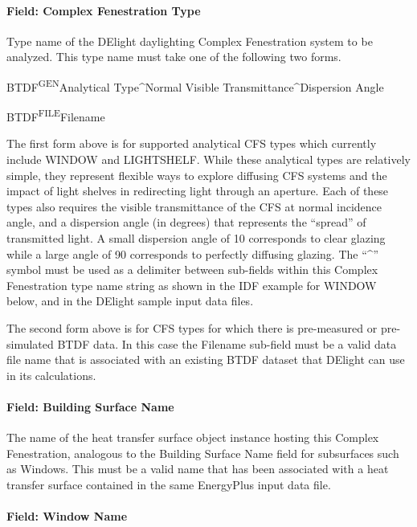\paragraph{Field: Complex Fenestration Type}\label{field-complex-fenestration-type}

Type name of the DElight daylighting Complex Fenestration system to be analyzed. This type name must take one of the following two forms.

BTDF\textsuperscript{GEN}Analytical Type\^{}Normal Visible Transmittance\^{}Dispersion Angle

BTDF\textsuperscript{FILE}Filename

The first form above is for supported analytical CFS types which currently include WINDOW and LIGHTSHELF. While these analytical types are relatively simple, they represent flexible ways to explore diffusing CFS systems and the impact of light shelves in redirecting light through an aperture. Each of these types also requires the visible transmittance of the CFS at normal incidence angle, and a dispersion angle (in degrees) that represents the ``spread'' of transmitted light. A small dispersion angle of 10 corresponds to clear glazing while a large angle of 90 corresponds to perfectly diffusing glazing. The ``\^{}'' symbol must be used as a delimiter between sub-fields within this Complex Fenestration type name string as shown in the IDF example for WINDOW below, and in the DElight sample input data files.

The second form above is for CFS types for which there is pre-measured or pre-simulated BTDF data. In this case the Filename sub-field must be a valid data file name that is associated with an existing BTDF dataset that DElight can use in its calculations.

\paragraph{Field: Building Surface Name}\label{field-building-surface-name}

The name of the heat transfer surface object instance hosting this Complex Fenestration, analogous to the Building Surface Name field for subsurfaces such as Windows. This must be a valid name that has been associated with a heat transfer surface contained in the same EnergyPlus input data file.

\paragraph{Field: Window Name}\label{field-window-name}

